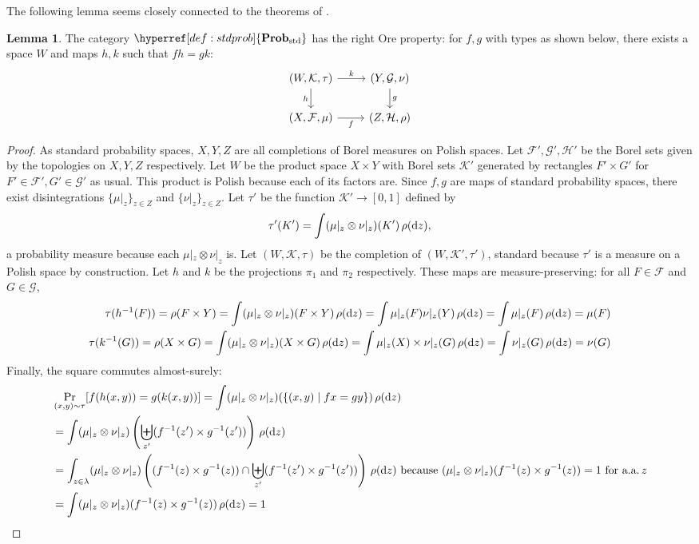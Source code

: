 \documentclass[
  sigconf,
  screen, ]{acmart}
\theoremstyle{definition}
\newtheorem{lemma}[theorem]{Lemma}
\newcommand\calF{\mathcal F}
\newcommand\calG{\mathcal G}
\newcommand\calH{\mathcal H}
\newcommand\calK{\mathcal K}
\newcommand\commsquare[8]{
\begin{tikzcd}[ampersand replacement=\&]
{#1} \arrow[d, "{#4}"'] \arrow[r, "{#2}"] \& {#3} \arrow[d, "{#5}"] \\
{#6} \arrow[r, "{#7}"']                \& {#8}
\end{tikzcd}
}
\newcommand\nref[2]{\hyperref[#1]{#2}} \newcommand\checkhigh{{\huge{\color{red}\textbf{TODO: check}}}}
\newcommand\texStdProb{\mathbf{Prob}_{\rm std}}
\newcommand\StdProb{{\nref{def:stdprob}{\texStdProb}}}
\begin{document}
The following lemma seems closely connected to the theorems of \citet{edalat1999semi}.
\begin{lemma} \label{lem:std-prob-right-ore}
  The category $\StdProb$
  has the right Ore property: for $f,g$
  with types as shown below,
  there exists a space $W$ and maps $h,k$
  such that $fh = gk$:
  \[ \commsquare{(W,\calK,\tau)}{k}{(Y,\calG,\nu)}{h}{g}{(X,\calF,\mu)}{f}{(Z,\calH,\rho)} \]
\end{lemma}
\begin{proof}
  As standard probability spaces,
  $X,Y,Z$ are all completions of Borel measures on
  Polish spaces.
  Let $\calF',\calG',\calH'$ be the Borel sets
  given by the topologies on $X,Y,Z$ respectively.
  Let $W$ be the product space $X\times Y$
  with Borel sets $\calK'$ generated by rectangles
  $F'\times G'$ for $F'\in\calF',G'\in\calG'$ as usual.
  This product is Polish because each of its factors are.
  Since $f,g$ are maps of standard probability spaces, there exist
  disintegrations $\{\mu|_z\}_{z\in Z}$ and $\{\nu|_z\}_{z\in Z}$.
  Let $\tau'$ be the function $\calK'\to[0,1]$ defined by
  \[ \tau'(K') = \int (\mu|_z\otimes \nu|_z)(K')\,\rho({\rm d}z), \]
  a probability measure because each $\mu|_z\otimes\nu|_z$ is.
  Let $(W,\calK,\tau)$ be the completion of $(W,\calK',\tau')$,
  standard because $\tau'$ is a measure on a Polish space by construction.
  Let $h$ and $k$ be the projections $\pi_1$ and $\pi_2$ respectively.
  These maps are measure-preserving: for all $F\in\calF$ and $G\in\calG$,
  \begin{align*}
    \tau(h^{-1}(F)) = \rho(F\times Y) 
    = \int (\mu|_z\otimes \nu|_z)(F\times Y) \,\rho({\rm d}z)
    = \int \mu|_z(F)\nu|_z(Y) \,\rho({\rm d}z)
    = \int \mu|_z(F) \,\rho({\rm d}z) = \mu(F) \\
    \tau(k^{-1}(G)) = \rho(X\times G)
    = \int (\mu|_z\otimes \nu|_z)(X\times G) \,\rho({\rm d}z)
    = \int \mu|_z(X)\times\nu|_z(G) \,\rho({\rm d}z)
    = \int \nu|_z(G) \,\rho({\rm d}z) = \nu(G)
  \end{align*}
  Finally, the square commutes almost-surely:
  \begin{align*}
    &\Pr_{(x,y)\sim\tau}[f(h(x,y)) = g(k(x,y))]
     = \int (\mu|_z\otimes \nu|_z)(\{(x,y) \mid fx = gy\}) \,\rho({\rm d}z)\\
     &= \int (\mu|_z\otimes \nu|_z)\left(\biguplus_{z'} (f^{-1}(z') \times g^{-1}(z'))\right)\,\rho({\rm d}z) \\
     &= \int_{z\in \lambda} (\mu|_z\otimes \nu|_z)\left((f^{-1}(z) \times g^{-1}(z)) \cap \biguplus_{z'} (f^{-1}(z') \times g^{-1}(z'))\right) \,\rho({\rm d}z)
        \text{ because $(\mu|_z\otimes\nu|_z)(f^{-1}(z)\times g^{-1}(z)) = 1$ for a.a.\,$z$} \\
     &= \int (\mu|_z\otimes \nu|_z)(f^{-1}(z) \times g^{-1}(z)) \,\rho({\rm d}z)
     = 1
  \end{align*}
\end{proof}
\end{document}
